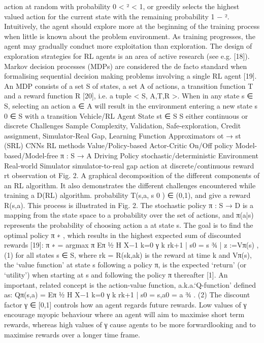 action at random with probability 0 < ² < 1, or greedily
selects the highest valued action for the current state with
the remaining probability 1 − ². Intuitively, the agent should
explore more at the beginning of the training process when
little is known about the problem environment. As training
progresses, the agent may gradually conduct more exploitation
than exploration. The design of exploration strategies for RL
agents is an area of active research (see e.g. [18]).
Markov decision processes (MDPs) are considered the de
facto standard when formalising sequential decision making
problems involving a single RL agent [19]. An MDP consists
of a set S of states, a set A of actions, a transition function
T and a reward function R [20], i.e. a tuple < S, A,T,R >.
When in any state s ∈ S, selecting an action a ∈ A will result
in the environment entering a new state s
0 ∈ S with a transition
Vehicle/RL Agent
State st ∈ S
S either continuous
or discrete
Challenges
Sample Complexity, Validation,
Safe-exploration, Credit assignment,
Simulator-Real Gap, Learning
Function Approximators
ot → st (SRL)
CNNs
RL methods
Value/Policy-based
Actor-Critic
On/Off policy
Model-based/Model-free
π : S → A
Driving Policy
stochastic/deterministic
Environment Real-world Simulator
simulator-to-real gap
action at
discrete/continuous
reward rt
observation ot
Fig. 2. A graphical decomposition of the different components of an RL
algorithm. It also demonstrates the different challenges encountered while
training a D(RL) algorithm.
probability T(s,a, s
0
) ∈ (0,1), and give a reward R(s,a). This
process is illustrated in Fig. 2. The stochastic policy π : S → D
is a mapping from the state space to a probability over the set
of actions, and π(a|s) represents the probability of choosing
action a at state s. The goal is to find the optimal policy
π
∗
, which results in the highest expected sum of discounted
rewards [19]:
π
∗ = argmax
π
Eπ
½ H
X−1
k=0
γ
k
rk+1 | s0 = s
¾
| {z }
:=Vπ(s)
, (1)
for all states s ∈ S, where rk = R(sk,ak) is the reward at time
k and Vπ(s), the ‘value function’ at state s following a policy
π, is the expected ‘return’ (or ‘utility’) when starting at s and
following the policy π thereafter [1]. An important, related
concept is the action-value function, a.k.a.‘Q-function’ defined
as:
Qπ(s,a) = Eπ
½ H
X−1
k=0
γ
k
rk+1 | s0 = s,a0 = a
¾
. (2)
The discount factor γ ∈ [0,1] controls how an agent regards
future rewards. Low values of γ encourage myopic behaviour
where an agent will aim to maximise short term rewards,
whereas high values of γ cause agents to be more forwardlooking and to maximise rewards over a longer time frame.
